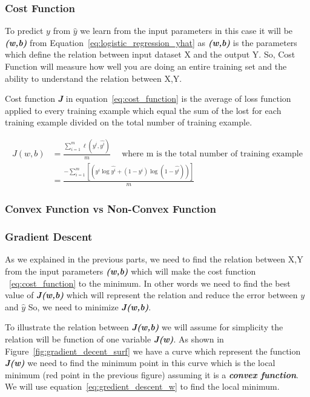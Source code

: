 \subsubsection{Cost Function}
    To predict $y$ from $\widehat{y}$ we learn from the input parameters in this case it will be \textbf{\textit{(w,b)}} from Equation~\eqref{eq:logistic_regression_yhat} as  \textbf{\textit{(w,b)}} is the parameters which define the relation between input dataset X and the output Y. So, Cost Function will measure how well you are doing an entire training set and the ability to understand the relation between X,Y.

Cost function \textbf{\textit{J}} in equation~\eqref{eq:cost_function} is the average of loss function applied to every training example which equal the sum of the lost for each training example divided on the total number of training example.



\begin{equation}\label{eq:cost_function}
  \begin{split}
  J(w,b) & = \frac{\sum_{i=1}^{m}  \ell(y^i,\widehat{y^i})}{m} \quad \text{ where m is the total number of training example} \\
  & = \frac {- \sum_{i=1}^{m} [(y^i \log \widehat{y^i} + (1-y^i) \log (1-\widehat{y^i}))]}{m}  
  \end{split}
\end{equation}


\subsubsection{Convex Function vs Non-Convex Function }

\newpage
\subsubsection{Gradient Descent}

As we explained in the previous parts, we need to find the relation between X,Y from the input parameters \textbf{\textit{(w,b)}} which will make the cost function ~\eqref{eq:cost_function} to the minimum. In other words we need to find the best value of \textbf{\textit{J(w,b)}} which will represent the relation and reduce the error between $y$ and $\widehat{y}$  So, we need to minimize \textbf{\textit{J(w,b)}}. 




To illustrate the relation between \textbf{\textit{J(w,b)}} we will assume for simplicity the relation will be function of one variable \textbf{\textit{J(w)}}. As shown in Figure~\ref{fig:gradient_decent_surf} we have a curve which represent the function \textbf{\textit{J(w)}} we need to find the minimum point in this curve which is the local minimum (red point in the previous figure) assuming it is a  \textbf{\textit{convex function}}. We will use equation~\eqref{eq:gredient_descent_w} to find the local minimum.

